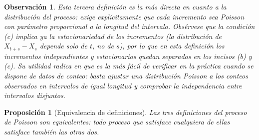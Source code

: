 \documentclass[12pt]{book}
\newtheorem{proposition}{Proposición}[chapter]
\newtheorem{remark}{Observación}[chapter]
\begin{document}
\begin{remark}
Esta tercera definición es la más directa en cuanto a la distribución del proceso: exige explícitamente que cada incremento sea Poisson con parámetro proporcional a la longitud del intervalo. Obsérvese que la condición (c) implica ya la estacionariedad de los incrementos (la distribución de $X_{t+s}-X_s$ depende solo de $t$, no de $s$), por lo que en esta definición los incrementos independientes y estacionarios quedan separados en los incisos (b) y (c). Su utilidad radica en que es la más fácil de verificar en la práctica cuando se dispone de datos de conteo: basta ajustar una distribución Poisson a los conteos observados en intervalos de igual longitud y comprobar la independencia entre intervalos disjuntos.
\end{remark}

%
\begin{proposition}[Equivalencia de definiciones]
\label{prop:equivalencia_PP}
Las tres definiciones del proceso de Poisson son equivalentes: todo proceso que satisface cualquiera de ellas satisface también las otras dos.
\end{proposition}
\end{document}
